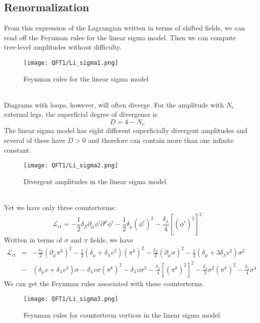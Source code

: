 \subsection{Renormalization}
From this expression of the Lagrangian written in terms of shifted fields, we can read off the Feynman rules for the linear sigma model. Then we can compute tree-level amplitudes without difficulty.
\\
\begin{figure}[!h]
\centering
\texttt{[image: QFT1/Li\_sigma1.png]}
\caption{Feynman rules for the linear sigma model}
\end{figure}
\\
Diagrams with loops, however, will often diverge. For the amplitude with $N_e$ external legs, the superficial degree of divergence is
\[D = 4 - N_e\]
The linear sigma model has eight different superficially divergent amplitudes and several of these have $D > 0$ and therefore can contain more than one infinite constant.
\\
\begin{figure}[!h]
\centering
\texttt{[image: QFT1/Li\_sigma2.png]}
\caption{Divergent amplitudes in the linear sigma model}
\end{figure}
\\
Yet we have only three counterterms:
\[\mathcal{L}_{ct} = -\frac{1}{2} \delta_Z \partial_{\mu} \phi^i \partial^{\mu}\phi^i - \frac{1}{2} \delta_{\mu} (\phi^i)^2 - \frac{\delta_{\lambda}}{4} [(\phi^i)^2]^2 \]
Written in terms of $\sigma$ and $\pi$ fields, we have
\begin{eqnarray}
\mathcal{L}_{ct} &=& -\frac{\delta_Z}{2}(\partial_{\mu}\pi^k)^2 - \frac{1}{2}(\delta_{\mu}+\delta_{\lambda}v^2)(\pi^k)^2 -\frac{\delta_Z}{2}(\partial_{\mu}\sigma)^2 - \frac{1}{2}(\delta_{\mu} + 3\delta_{\lambda}v^2)\sigma^2 \nonumber \\
&-& (\delta_{\mu}v + \delta_{\lambda}v^3)\sigma - \delta_{\lambda}v\sigma(\pi^k)^2 - \delta_{\lambda}v\sigma^3 - \frac{\delta_{\lambda}}{4}[(\pi^k)^2]^2 - \frac{\delta_{\lambda}}{2}\sigma^2 (\pi^k)^2 - \frac{\delta_{\lambda}}{4}\sigma^4 \nonumber
\end{eqnarray}
We can get the Feynman rules associated with these counterterms.
\\
\begin{figure}[!h]
\centering
\texttt{[image: QFT1/Li\_sigma3.png]}
\caption{Feynman rules for counterterm vertices in the linear sigma model}
\end{figure}
